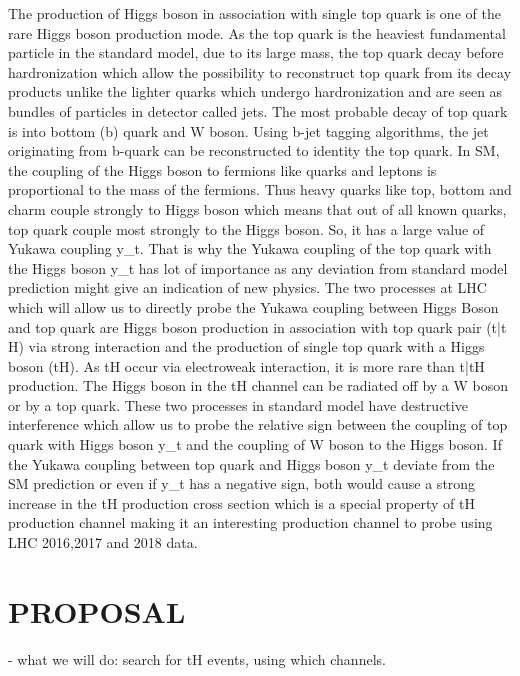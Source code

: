 \documentclass[final,3p]{CSP}
\begin{document}
The production of Higgs boson in association with single top quark is one of the rare Higgs boson production mode. As the top 
quark is the heaviest fundamental particle in the standard model, due to its large mass, the top quark decay before 
hardronization which allow the possibility to reconstruct top quark from its decay products unlike the lighter quarks which 
undergo hardronization and are seen as bundles of particles in detector called jets. The most probable decay of top quark is into 
bottom (b) quark and W boson. Using b-jet tagging algorithms, the jet originating from b-quark can be reconstructed to identity 
the top quark. In SM, the coupling of the Higgs boson to fermions like quarks and leptons is proportional to the mass of the 
fermions. Thus heavy quarks like top, bottom and charm couple strongly to Higgs boson which means that out of all known quarks, 
top quark couple most strongly to the Higgs boson. So, it has a large value of Yukawa coupling y_t. That is why the Yukawa 
coupling of the top quark with the Higgs boson y_t has lot of importance as any deviation from standard model prediction might 
give an indication of new physics. The two processes at LHC which will allow us to directly probe the Yukawa coupling between 
Higgs Boson and top quark are Higgs boson production in association with top quark pair (t\bar{t} H) via strong interaction and 
the production of single top quark with a Higgs boson (tH). As tH occur via electroweak interaction, it is more rare than 
t\bar{t}H production. The Higgs boson in the tH channel can be radiated off by a W boson or by a top quark. These two processes 
in standard model have destructive interference which allow us to probe the relative sign between the coupling of top quark with 
Higgs boson y_t and the coupling of W boson to the Higgs boson. If the Yukawa coupling between top quark and Higgs boson y_t 
deviate from the SM prediction or even if y_t has a negative sign, both would cause a strong increase in the tH production cross 
section which is a special property of tH production channel making it an interesting production channel to probe using LHC 
2016,2017 and 2018 data.  

 









\section{PROPOSAL}
- what we will do:  search for tH events, using which channels.
\end{document}
